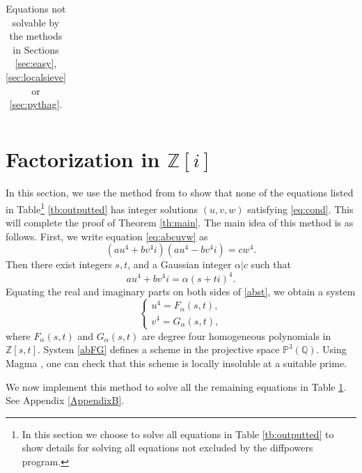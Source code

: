 \documentclass[a4paper,12pt,english,reqno]{amsart}
\newcommand{\Z}{{\mathbb Z}}
\newcommand{\Q}{{\mathbb Q}}
\begin{document}
\begin{table}
\begin{center}
\begin{tabular}{|c|c||c|c|c|c|}
\end{tabular}
\caption{Equations not solvable by the methods in Sections \ref{sec:easy}, \ref{sec:localsieve} or \ref{sec:pythag}. \label{tb:factorisation}}
\end{center}
\end{table}




    
\section{Factorization in \texorpdfstring{$\Z[i]$}{}}\label{sec:factor}  

In this section, we use the method from \cite{THO2026125764} to show that none of the equations listed in Table\footnote{In this section we choose to solve all equations in Table \ref{tb:outputted} to show details for solving all equations not excluded by the diffpowers program.} \ref{tb:outputted} has integer solutions $(u,v,w)$ satisfying \eqref{eq:cond}. This will complete the proof of Theorem \ref{th:main}.
The main idea of this method is as follows. First, we write equation \eqref{eq:abcuvw} as
\[(au^4+bv^4i)(au^4-bv^4i)=cw^4.\]
Then there exist integers $s,t$, and a Gaussian integer $\alpha|c$ such that  \begin{equation}\label{abst}au^4+bv^4i=\alpha (s+ti)^4.\end{equation}
Equating the real and imaginary parts on both sides of \eqref{abst}, we obtain a system
\begin{equation}\label{abFG}
    \begin{cases}
        u^4=F_{\alpha}(s,t),\\
        v^4=G_{\alpha}(s,t),
    \end{cases}
\end{equation}
where $F_{\alpha}(s,t)$ and $G_{\alpha}(s,t)$ are degree four homogeneous polynomials in $\Z[s,t]$. System \eqref{abFG} defines a scheme in the  projective space $\mathbb{P}^3(\Q)$. Using Magma \cite{MR1484478}, one can check that this scheme is locally insoluble at a suitable prime.

We now implement this method to solve all the remaining equations in Table \ref{tb:factorisation}. See Appendix \ref{AppendixB}.
\end{document}
